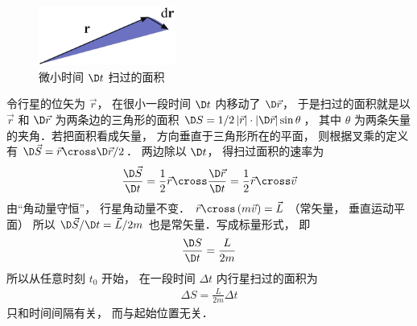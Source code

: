 
\begin{figure}[ht]
\centering
\includegraphics[width=4.5cm]{./figures/Keple21.pdf}
\caption{微小时间 $\D t$ 扫过的面积} \label{Keple21}
\end{figure}

令行星的位矢为 $\vec r$，  在很小一段时间 $\D t$ 内移动了 $\D \vec r$，  于是扫过的面积就是以 $\vec r$ 和 $\D \vec r$ 为两条边的三角形的面积 $\D S = {1}/{2}\left| {\vec r} \right| \cdot \left| {\D \vec r} \right|\sin \theta $，  其中 $\theta $ 为两条矢量的夹角．若把面积看成矢量， 方向垂直于三角形所在的平面， 则根据叉乘的定义有 $\D \vec S = \vec r \cross \D \vec r/2$． 两边除以 $\D t$，  得扫过面积的速率为
\begin{equation}
  \frac{{\D\vec S}}{{\D t}} = \frac{1}{2}\vec r \cross \frac{{\D\vec r}}{{\D t}} = \frac 12 \vec r\cross \vec v
\end{equation}
由“角动量守恒”， 行星角动量不变．
$\vec r \cross \left( {m\vec v} \right) = \vec L$ （常矢量， 垂直运动平面） 所以 ${{\D\vec S}}/{{\D t}} = {{\vec L}}/{{2m}}$ 也是常矢量．写成标量形式， 即
\begin{equation}
  \frac{{\D S}}{{\D t}} = \frac{L}{{2m}}
\end{equation}
所以从任意时刻 ${t_0}$ 开始， 在一段时间 $\Delta t$ 内行星扫过的面积为 
\begin{equation}
  \begin{aligned}
  \Delta S = \frac{L}{{2m}}\Delta t
  \end{aligned}
\end{equation}
只和时间间隔有关， 而与起始位置无关．

